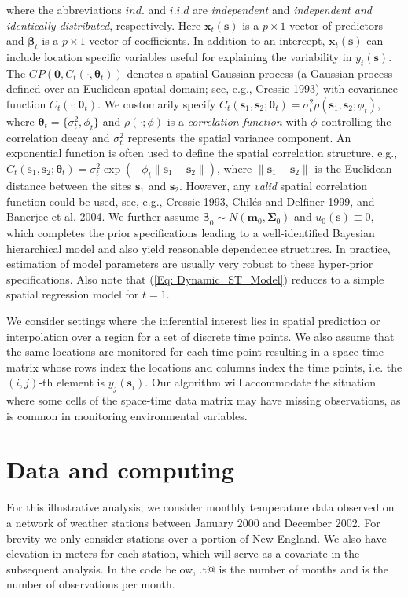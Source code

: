 \documentclass{article}
\newcommand{\bm}{ {\boldsymbol m} }
\newcommand{\bs}{ {\boldsymbol s} }
\newcommand{\bx}{ {\boldsymbol x} }
\newcommand{\bbeta}{ {\boldsymbol \beta} }
\newcommand{\bSigma}{ {\boldsymbol \Sigma} }
\newcommand{\btheta}{ {\boldsymbol \theta} }
\newcommand{\bzero}{ {\boldsymbol 0} }
\begin{document}
where the abbreviations $ind.$ and $i.i.d$ are \emph{independent} and \emph{independent and identically distributed}, respectively. Here $\bx_t(\bs)$ is a $p\times 1$ vector of predictors and $\bbeta_t$ is a $p\times 1$ vector of coefficients. In addition to an intercept, $\bx_t(\bs)$ can include location specific variables useful for explaining the variability in $y_t(\bs)$. The $GP(\bzero, C_t(\cdot,\btheta_t))$ denotes a spatial Gaussian process (a Gaussian process defined over an Euclidean spatial domain; see, e.g., Cressie 1993) with covariance function $C_{t}(\cdot;\btheta_t)$. We customarily specify $C_{t}(\bs_1,\bs_2;\btheta_t)=\sigma_t^2\rho(\bs_1,\bs_2;\phi_t)$, where $\btheta_t = \{\sigma_t^2,\phi_t\}$ and $\rho(\cdot;\phi)$ is a \emph{correlation function} with $\phi$ controlling the correlation decay and $\sigma_t^2$ represents the spatial variance component. An exponential function is often used to define the spatial correlation structure, e.g., $C_{t}(\bs_1,\bs_2;\btheta_t)=\sigma_t^2\exp(-\phi_t\|\bs_1-\bs_2\|)$, where $\|\bs_1-\bs_2\|$ is the Euclidean distance between the sites $\bs_1$ and $\bs_2$. However, any \emph{valid} spatial correlation function could be used, see, e.g., Cressie 1993, Chil\'{e}s and Delfiner 1999, and Banerjee et al. 2004. We further assume $\bbeta_0 \sim N(\bm_0, \bSigma_0)$ and $u_0(\bs) \equiv 0$, which completes the prior specifications leading to a well-identified Bayesian hierarchical model and also yield reasonable dependence structures. In practice, estimation of model parameters are usually very robust to these hyper-prior specifications. Also note that (\ref{Eq: Dynamic_ST_Model}) reduces to a simple spatial regression model for $t=1$.  

We consider settings where the inferential interest lies in spatial prediction or interpolation over a region for a set of discrete time points. We also assume that the same locations are monitored for each time point resulting in a space-time matrix whose rows index the locations and columns index the time points, i.e. the $(i,j)$-th element is $y_j(\bs_i)$. Our algorithm will accommodate the situation where some cells of the space-time data matrix may have missing observations, as is common in monitoring environmental variables.

\section{Data and computing}\label{data}
For this illustrative analysis, we consider monthly temperature data observed on a network of weather stations between January 2000 and December 2002. For brevity we only consider stations over a portion of New England. We also have elevation in meters for each station, which will serve as a covariate in the subsequent analysis. In the code below, \verb@N.t@ is the number of months and \verb@n@ is the number of observations per month. 
\end{document}

